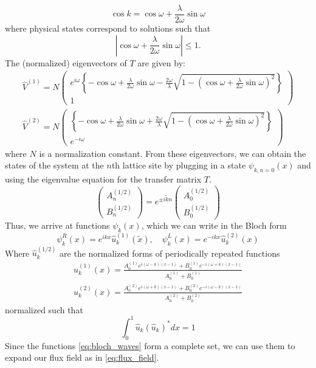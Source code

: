 \begin{equation}
    \cos{k} = \cos{\omega} + \frac{\lambda}{2\omega}\sin{\omega}
\end{equation}
%
where physical states correspond to solutions such that
\begin{equation}\label{eq:band_condition}
    \left|\cos{\omega} + \frac{\lambda}{2\omega}\sin{\omega}\right|\leq 1.
\end{equation}
%
The (normalized) eigenvectors of $T$ are given by:
\begin{gather}
    \hat{V}^{(1)}
    = N
    \begin{pmatrix}
    e^{i\omega}\left\lbrace-\cos{\omega} + \frac{\lambda}{2\omega}\sin{\omega} - \frac{2\omega}{\lambda}\sqrt{1-\left(\cos{\omega+\frac{\lambda}{2\omega}\sin{\omega}}\right)^2}
    \right\rbrace \\ 1 \end{pmatrix} \\
    \hat{V}^{(2)}
    = N
    \begin{pmatrix}
    \left\lbrace-\cos{\omega} + \frac{\lambda}{2\omega}\sin{\omega} + \frac{2\omega}{\lambda}\sqrt{1-\left(\cos{\omega+\frac{\lambda}{2\omega}\sin{\omega}}\right)^2}
    \right\rbrace \\ e^{-i\omega} \end{pmatrix}
\end{gather}
%
where $N$ is a normalization constant. From these eigenvectors, we can obtain the states of the system at the $n$th lattice site by plugging in a state $\psi_{k,n=0}(x)$ and using the eigenvalue equation for the transfer matrix $T$.
\begin{equation}
    \begin{pmatrix}
    A_n^{(1/2)} \\ B_n^{(1/2)}
    \end{pmatrix}
    = e^{\pm i\tilde{k}n} 
    \begin{pmatrix}
    A_0^{(1/2)} \\ B_0^{(1/2)}
    \end{pmatrix}
\end{equation}
%
Thus, we arrive at functions $\psi_{k}(x)$, which we can write in the Bloch form
\begin{equation}\label{eq:bloch_waves}
    \psi_{k}^R (x) =e^{ikx} \hat{u}_{k}^{(1)}(\tilde{x}), \hspace{12pt}  \psi_{k}^L(x) =e^{-ikx} \hat{u}_{k}^{(2)}(x) 
\end{equation}
%
Where $\hat{u}_{k}^{(1/2)}$ are the normalized forms of periodically repeated functions
\begin{gather}
      u_{k}^{(1)}(x) = 
      \frac{A_0^{(1)} e^{i(\omega-k)(x-1)} + B_0^{(1)} e^{-i(\omega+k)(x-1)}}{A_0^{(1)}+B_0^{(1)}}\\
       u_{k}^{(2)}(x) =
      \frac{A_0^{(2)} e^{i(\omega+k)(x-1)} + B_0^{(2)} e^{-i(\omega-k)(x-1)}}{A_0^{(2)}+B_0^{(2)}}
\end{gather}
%
normalized such that
\begin{equation}
\int_0^1 \hat{u}_{k} (\hat{u}_{k})^* dx = 1
\end{equation}
%
Since the functions \ref{eq:bloch_waves} form a complete set, we can use them to expand our flux field as in \ref{eq:flux_field}.
%